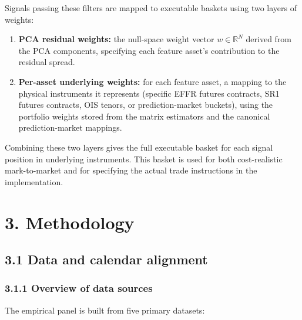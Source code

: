 Signals passing these filters are mapped to executable baskets using two layers of weights:
\begin{enumerate}
    \item \textbf{PCA residual weights:} the null-space weight vector $w \in \mathbb{R}^N$ derived from the PCA components, specifying each feature asset's contribution to the residual spread.
    \item \textbf{Per-asset underlying weights:} for each feature asset, a mapping to the physical instruments it represents (specific EFFR futures contracts, SR1 futures contracts, OIS tenors, or prediction-market buckets), using the portfolio weights stored from the matrix estimators and the canonical prediction-market mappings.
\end{enumerate}
Combining these two layers gives the full executable basket for each signal position in underlying instruments. This basket is used for both cost-realistic mark-to-market and for specifying the actual trade instructions in the implementation.



\section*{3. Methodology}

\subsection*{3.1 Data and calendar alignment}

\subsubsection*{3.1.1 Overview of data sources}

The empirical panel is built from five primary datasets:


